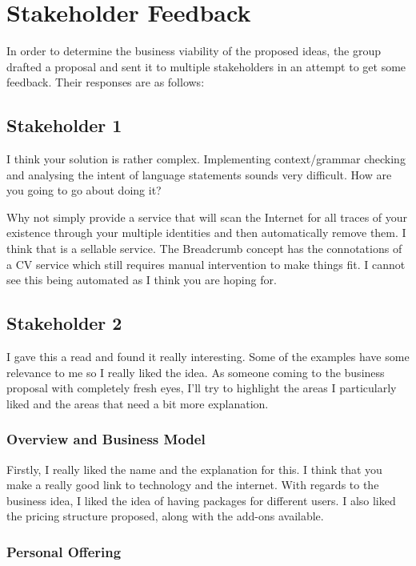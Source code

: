 \section{Stakeholder Feedback}

  In order to determine the business viability of the proposed ideas, the group drafted a proposal and sent it to multiple stakeholders in an attempt to get some feedback. Their responses are as follows:

  \subsection{Stakeholder 1}

    I think your solution is rather complex. Implementing context/grammar checking and analysing the intent of language statements sounds very difficult. How are you going to go about doing it?

    Why not simply provide a service that will scan the Internet for all traces of your existence through your multiple identities and then automatically remove them. I think that is a sellable service. The Breadcrumb concept has the connotations of a CV service which still requires manual intervention to make things fit. I cannot see this being automated as I think you are hoping for.

  \subsection{Stakeholder 2}

    I gave this a read and found it really interesting. Some of the examples have some relevance to me so I really liked the idea. As someone coming to the business proposal with completely fresh eyes, I'll try to highlight the areas I particularly liked and the areas that need a bit more explanation.

    \subsubsection{Overview and Business Model}

      Firstly, I really liked the name and the explanation for this. I think that you make a really good link to technology and the internet. With regards to the business idea, I liked the idea of having packages for different users. I also liked the pricing structure proposed, along with the add-ons available.

    \subsubsection{Personal Offering}

